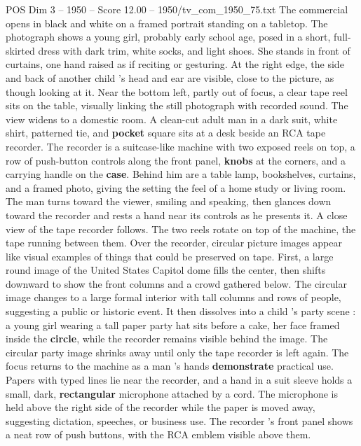 \begin{textsample}{POS Dim 3 – 1950 – Score 12.00 – 1950/tv\_com\_1950\_75.txt}  \label{ex:f3_pos_013}
The commercial opens in black and white on a framed portrait standing on a tabletop.
The photograph shows a young girl, probably early school age, posed in a short, full-skirted dress with dark trim, white socks, and light shoes.
She stands in front of curtains, one hand raised as if reciting or gesturing.
At the right edge, the side and back of another child ’s head and ear are visible, close to the picture, as though looking at it.
Near the bottom left, partly out of focus, a clear tape reel sits on the table, visually linking the still photograph with recorded sound.
The view widens to a domestic room.
A clean-cut adult man in a dark suit, white shirt, patterned tie, and \textbf{pocket} square sits at a desk beside an RCA tape recorder.
The recorder is a suitcase-like machine with two exposed reels on top, a row of push-button controls along the front panel, \textbf{knobs} at the corners, and a carrying handle on the \textbf{case}.
Behind him are a table lamp, bookshelves, curtains, and a framed photo, giving the setting the feel of a home study or living room.
The man turns toward the viewer, smiling and speaking, then glances down toward the recorder and rests a hand near its controls as he presents it.
A close view of the tape recorder follows.
The two reels rotate on top of the machine, the tape running between them.
Over the recorder, circular picture images appear like visual examples of things that could be preserved on tape.
First, a large round image of the United States Capitol dome fills the center, then shifts downward to show the front columns and a crowd gathered below.
The circular image changes to a large formal interior with tall columns and rows of people, suggesting a public or historic event.
It then dissolves into a child ’s party scene : a young girl wearing a tall paper party hat sits before a cake, her face framed inside the \textbf{circle}, while the recorder remains visible behind the image.
The circular party image shrinks away until only the tape recorder is left again.
The focus returns to the machine as a man ’s hands \textbf{demonstrate} practical use.
Papers with typed lines lie near the recorder, and a hand in a suit sleeve holds a small, dark, \textbf{rectangular} microphone attached by a cord.
The microphone is held above the right side of the recorder while the paper is moved away, suggesting dictation, speeches, or business use.
The recorder ’s front panel shows a neat row of push buttons, with the RCA emblem visible above them.

\end{textsample}
